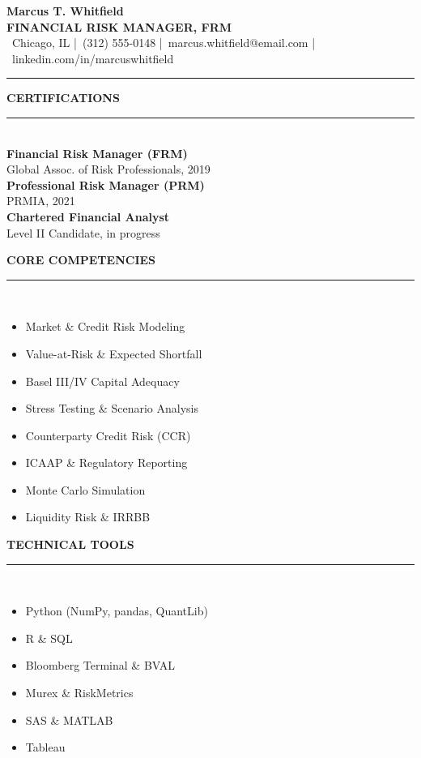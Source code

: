 \documentclass[10pt]{article}
\newcommand{\sectionhead}[1]{%
  \par\vspace{5pt}
  {\color{navy}\fontsize{10.5}{12}\selectfont\bfseries\MakeUppercase{#1}}\\[1pt]
  {\color{gold}\rule{\linewidth}{1pt}}\\[4pt]%
}
\begin{document}
\begin{center}
{\fontsize{23}{25}\selectfont\bfseries\color{navy} Marcus T. Whitfield}\\[3pt]
{\fontsize{11.5}{13}\selectfont\bfseries\color{gold!65!navy} FINANCIAL RISK MANAGER, FRM}\\[5pt]
{\small\color{slate}%
\faMapMarker\ Chicago, IL \quad\textcolor{hair}{|}\quad \faPhone\ (312) 555-0148 \quad\textcolor{hair}{|}\quad \faEnvelope\ marcus.whitfield@email.com \quad\textcolor{hair}{|}\quad \faLinkedin\ linkedin.com/in/marcuswhitfield%
}
\end{center}
\vspace{4pt}
{\color{navy}\rule{\linewidth}{1.3pt}}

\vspace{2pt}
\noindent
\begin{minipage}[t]{0.335\linewidth}

\sectionhead{Certifications}
\textbf{\small\color{navy}Financial Risk Manager (FRM)}\\
{\footnotesize\color{slate}Global Assoc. of Risk Professionals, 2019}\\[4pt]
\textbf{\small\color{navy}Professional Risk Manager (PRM)}\\
{\footnotesize\color{slate}PRMIA, 2021}\\[4pt]
\textbf{\small\color{navy}Chartered Financial Analyst}\\
{\footnotesize\color{slate}Level II Candidate, in progress}

\sectionhead{Core Competencies}
{\small
\begin{itemize}
\item Market \& Credit Risk Modeling
\item Value-at-Risk \& Expected Shortfall
\item Basel III/IV Capital Adequacy
\item Stress Testing \& Scenario Analysis
\item Counterparty Credit Risk (CCR)
\item ICAAP \& Regulatory Reporting
\item Monte Carlo Simulation
\item Liquidity Risk \& IRRBB
\end{itemize}
}

\sectionhead{Technical Tools}
{\small
\begin{itemize}
\item Python (NumPy, pandas, QuantLib)
\item R \& SQL
\item Bloomberg Terminal \& BVAL
\item Murex \& RiskMetrics
\item SAS \& MATLAB
\item Tableau
\end{itemize}
}


\end{minipage}
\end{document}
